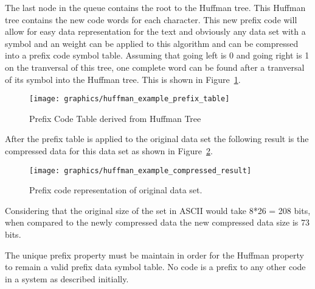 \documentclass[letterpaper, 12pt]{article}
\begin{document}
The last node in the queue contains the root to the Huffman tree. This Huffman tree
contains the new code words for each character. This new prefix code will allow for easy
data representation for the text and obviously any data set with a symbol and an weight can
be applied to this algorithm and can be compressed into a prefix code symbol table.
Assuming that going left is 0 and going right is 1 on the tranversal of this tree, one complete
word can be found after a tranversal of its symbol into the Huffman tree. This is shown in
Figure~\ref{fig:huffman_prefix_table}.
\par\vspace{\baselineskip}

\begin{figure}
  \centering
  \texttt{[image: graphics/huffman\_example\_prefix\_table]}
  \caption{Prefix Code Table derived from Huffman Tree}
  \label{fig:huffman_prefix_table}
\end{figure}

\par\vspace{\baselineskip}
After the prefix table is applied to the original data set the following result is the compressed
data for this data set as shown in Figure~\ref{fig:huffman_compressed}.
\par\vspace{\baselineskip}
\begin{figure}
  \centering
  \texttt{[image: graphics/huffman\_example\_compressed\_result]}
  \caption{Prefix code representation of original data set.}
  \label{fig:huffman_compressed}
\end{figure}

Considering that the original size of the set in ASCII would take 8*26 = 208 bits, when compared to
the newly compressed data the new compressed data size is 73 bits.
\par\vspace{\baselineskip}
The unique prefix property must be maintain in order for the Huffman property to remain a valid prefix
data symbol table. No code is a prefix to any other code in a system as described initially.
\par\vspace{\baselineskip}
\end{document}
